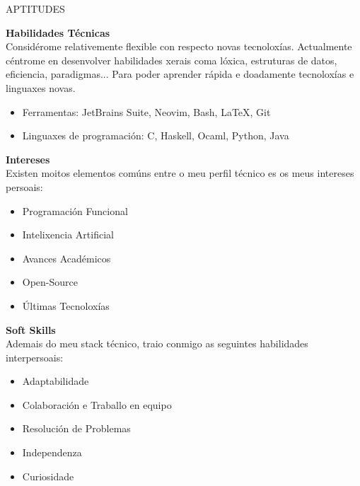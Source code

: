 \documentclass [10pt, a4paper] {extarticle}
\newcommand{\sectionlinethickness} {1.3 pt }
\newcommand{\leftcolumwidth} {0.18 }
\newcommand{\rightcolumwidth}{ 0.82 }
\newcommand {\sectiontitle}[1] {
    \begin {flushleft}
    \begin {minipage}[c]{\leftcolumwidth\textwidth}
        \begin {flushright}
        \!\MakeUppercase {#1}
        \hspace* {10px}
        \end {flushright}
    \end {minipage}
        \begin {tikzpicture}
            \hspace{-4px}
            \draw [line width=\sectionlinethickness, namelines] (1,0) -- (15.363,0);
        \end {tikzpicture}
    \end {flushleft}
}
\begin{document}

    \sectiontitle {aptitudes}

    \begin {flushright}
    \begin {minipage} [t] {\rightcolumwidth\textwidth}

        \textbf {Habilidades Técnicas} \\ [4px]
        Considérome relativemente flexible con respecto novas tecnoloxías. Actualmente céntrome en desenvolver habilidades xerais coma lóxica, estruturas de datos, eficiencia, paradigmas... Para poder aprender rápida e doadamente tecnoloxías e linguaxes novas.
        \vspace {-2px}
        \begin {itemize} [noitemsep]
            \item Ferramentas: JetBrains Suite, Neovim, Bash, LaTeX, Git
            \item Linguaxes de programación: C, Haskell, Ocaml, Python, Java
        \end {itemize}

        \begin {minipage} [t] {0.475\textwidth}
            \textbf {Intereses} \\ [4px]
            Existen moitos elementos comúns entre o meu perfil técnico es os meus intereses persoais:
            \vspace {-3px}
            \begin {itemize} [noitemsep]
                \item Programación Funcional
                \item Intelixencia Artificial
                \item Avances Académicos
                \item Open-Source
                \item Últimas Tecnoloxías
            \end {itemize}
        \end {minipage}
        \hfill
        \begin {minipage} [t] {0.475\textwidth}
            \textbf {Soft Skills} \\ [4px]
            Ademais do meu stack técnico, traio conmigo as seguintes habilidades interpersoais:
            \vspace {-3px}
            \begin {itemize} [noitemsep]
                \item Adaptabilidade
                \item Colaboración e Traballo en equipo
                \item Resolución de Problemas
                \item Independenza
                \item Curiosidade
            \end {itemize}
        \end {minipage}
    \end {minipage}
    \end {flushright}
\end{document}
